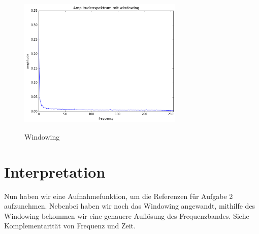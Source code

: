 \documentclass[TGAI_Laborbericht.tex]{subfiles}
\begin{document}
\begin{figure}[H]
	\includegraphics[width=0.7\textwidth]{media/windowing.png}
	\label{Windowing}
	\caption{Windowing}
\end{figure}




\section{Interpretation}
\label{chap:VERSUCH_1_INTERPRETATION}
Nun haben wir eine Aufnahmefunktion, um die Referenzen für Aufgabe 2 aufzunehmen. Nebenbei haben wir noch das Windowing angewandt, mithilfe des Windowing bekommen wir eine genauere Auflösung des Frequenzbandes. Siehe Komplementarität von Frequenz und Zeit. 
\end{document}

